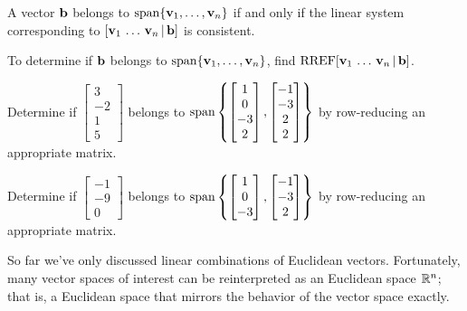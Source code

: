 \begin{applicationActivities}
\begin{fact}
  A vector \(\mathbf b\) belongs to
  \(\operatorname{span}\{\mathbf v_1,\dots,\mathbf v_n\}\) if and only if
  the linear system corresponding to
  \([\mathbf v_1\,\dots\,\mathbf v_n \,|\, \mathbf b]\)
  is consistent.
\end{fact}

\begin{remark}
  To determine if \(\mathbf b\) belongs to
  \(\operatorname{span}\{\mathbf v_1,\dots,\mathbf v_n\}\), find
  \(\operatorname{RREF}[\mathbf v_1\,\dots\,\mathbf v_n \,|\, \mathbf b]\).
\end{remark}

\begin{activity}{10}
  Determine if
  \(\begin{bmatrix}3\\-2\\1 \\ 5\end{bmatrix}\) belongs to
  \(\operatorname{span}\left\{\begin{bmatrix}1\\0\\-3 \\ 2\end{bmatrix},
  \begin{bmatrix}-1\\-3\\2 \\ 2\end{bmatrix}\right\}\)
  by row-reducing an appropriate matrix.
\end{activity}

\begin{activity}{5}
  Determine if
  \(\begin{bmatrix}-1\\-9\\0\end{bmatrix}\) belongs to
  \(\operatorname{span}\left\{\begin{bmatrix}1\\0\\-3\end{bmatrix},
  \begin{bmatrix}-1\\-3\\2\end{bmatrix}\right\}\)
  by row-reducing an appropriate matrix.
\end{activity}


\begin{observation}
  So far we've only discussed linear combinations of Euclidean vectors.
  Fortunately, many vector spaces of interest can be reinterpreted as an
   Euclidean space \(\mathbb{R}^n\); that is, a Euclidean space
  that mirrors the behavior of the vector space exactly.
\end{observation}


\end{applicationActivities}
